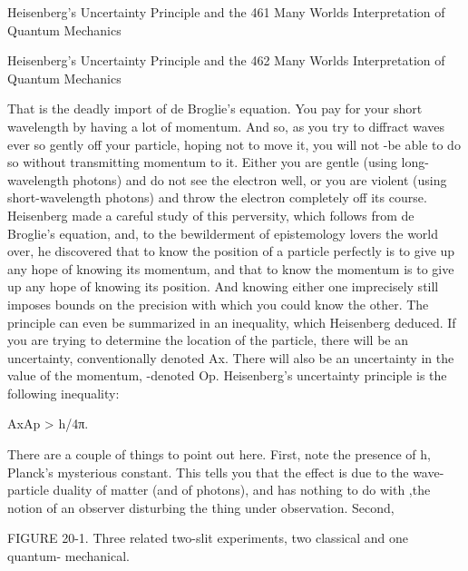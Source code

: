 Heisenberg's Uncertainty Principle and the                                             461
Many Worlds Interpretation of Quantum Mechanics

Heisenberg's Uncertainty Principle and the        462
Many Worlds Interpretation of Quantum Mechanics

That is the deadly import of de Broglie's equation. You pay for your short wavelength
 by having a lot of momentum. And so, as you try to diffract waves ever so gently off
      your particle, hoping not to move it, you will not -be able to do so without
 transmitting momentum to it. Either you are gentle (using long-wavelength photons)
 and do not see the electron well, or you are violent (using short-wavelength photons)
                    and throw the electron completely off its course.
        Heisenberg made a careful study of this perversity, which follows from de
Broglie's equation, and, to the bewilderment of epistemology lovers the world over,
he discovered that to know the position of a particle perfectly is to give up any hope
of knowing its momentum, and that to know the momentum is to give up any hope of
knowing its position. And knowing either one imprecisely still imposes bounds on the
precision with which you could know the other. The principle can even be
summarized in an inequality, which Heisenberg deduced. If you are trying to
determine the location of the particle, there will be an uncertainty, conventionally
denoted Ax. There will also be an uncertainty in the value of the momentum, -denoted
Op. Heisenberg's uncertainty principle is the following inequality:

                       AxAp > h/4π.

There are a couple of things to point out here. First, note the presence of h, Planck's
mysterious constant. This tells you that the effect is due to the wave-particle duality of
matter (and of photons), and has nothing to do with ,the notion of an observer
disturbing the thing under observation. Second,

FIGURE 20-1. Three related two-slit experiments, two classical and one quantum-
mechanical.

